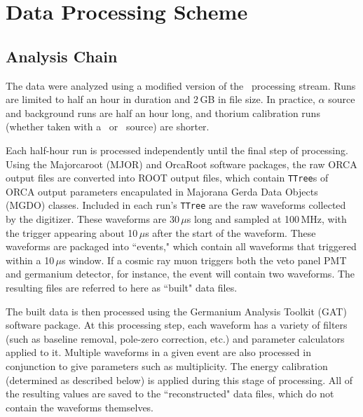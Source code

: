 \section{Data Processing Scheme}
\subsection{Analysis Chain}
The data were analyzed using a modified version of the \MJ\ processing stream. Runs are limited to half an hour in duration and 2\,GB in file size. In practice, $\alpha$ source and background runs are half an hour long, and thorium calibration runs (whether taken with a \thtte\ or \thttt\ source) are shorter.

Each half-hour run is processed independently until the final step of processing. Using the Majorcaroot (MJOR)  and OrcaRoot software packages, the raw ORCA output files are converted into ROOT output files, which contain {\tt TTree}s of ORCA output parameters encapulated in Majorana Gerda Data Objects (MGDO) classes. Included in each run's {\tt TTree} are the raw waveforms collected by the digitizer. These waveforms are 30\,$\mu$s long and sampled at 100\,MHz, with the trigger appearing about 10\,$\mu$s after the start of the waveform. These waveforms are packaged into ``events," which contain all waveforms that triggered within a 10\,$\mu$s window. If a cosmic ray muon triggers both the veto panel PMT and germanium detector, for instance, the event will contain two waveforms. The resulting files are referred to here as ``built" data files.

The built data is then processed using the Germanium Analysis Toolkit (GAT) software package. At this processing step, each waveform has a variety of filters (such as baseline removal, pole-zero correction, etc.) and parameter calculators applied to it. Multiple waveforms in a given event are also processed in conjunction to give parameters such as multiplicity. The energy calibration (determined as described below) is applied during this stage of processing. All of the resulting values are saved to the ``reconstructed" data files, which do not contain the waveforms themselves. 

